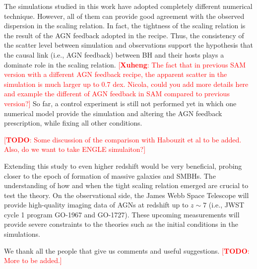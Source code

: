 \documentclass[twocolumn]{aastex631}
\newcommand{\todo}[1]{\textcolor{red}{[{\bf TODO}: #1]}}
\newcommand{\ding}[1]{\textcolor{red}{[{\bf Xuheng}: #1]}}
\begin{document}
The simulations studied in this work have adopted completely different numerical technique. However, all of them can provide good agreement with the observed dispersion in the scaling relation. In fact, the tightness of the scaling relation is the result of the AGN feedback adopted in the recipe. Thus, the consistency of the scatter level between simulation and observations support the hypothesis that the causal link (i.e., AGN feedback) between BH and their hosts plays a dominate role in the scaling relation. 
\ding{The fact that in previous SAM version with a different AGN feedback recipe, the apparent scatter in the simulation is much larger up to 0.7 dex. Nicola, could you add more details here and example the different of AGN feedback in SAM compared to previous version?}
So far, a control experiment is still not performed yet in which one numerical model provide the simulation and altering the AGN feedback prescription, while fixing all other conditions.

\todo{Some discussion of the comparison with Habouzit et al to be added. Also, do we want to take ENGLE simulaiton?}

Extending this study to even higher redshift would be very beneficial, probing closer to the epoch of formation of massive galaxies and SMBHs. The understanding of how and when the tight scaling relation emerged are crucial to test the theory. On the observational side, the James Webb Space Telescope will provide high-quality imaging data of AGNs at redshift up to $z\sim7$ (i.e., JWST cycle 1 program GO-1967 and GO-1727). These upcoming measurements will provide severe constraints to the theories such as the initial conditions in the simulations.


\begin{acknowledgments}
We thank all the people that give us comments and useful suggestions. \todo{More to be added.}

\end{acknowledgments}


\vspace{5mm}

\end{document}
